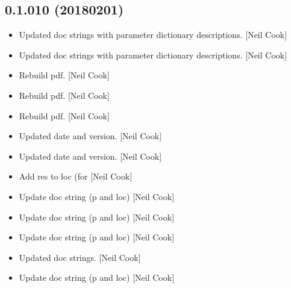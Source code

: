 \documentclass[a4paper,10pt,english]{report}
\begin{document}
\subsection{0.1.010 (2018\sphinxhyphen{}02\sphinxhyphen{}01)}
\label{\detokenize{misc/changelog:id512}}\begin{itemize}
\item {} 
Updated doc strings with parameter dictionary descriptions. {[}Neil
Cook{]}

\item {} 
Updated doc strings with parameter dictionary descriptions. {[}Neil
Cook{]}

\item {} 
Rebuild pdf. {[}Neil Cook{]}

\item {} 
Rebuild pdf. {[}Neil Cook{]}

\item {} 
Rebuild pdf. {[}Neil Cook{]}

\item {} 
Updated date and version. {[}Neil Cook{]}

\item {} 
Updated date and version. {[}Neil Cook{]}

\item {} 
Add res to loc (for  {[}Neil Cook{]}

\item {} 
Update doc string (p and loc) {[}Neil Cook{]}

\item {} 
Update doc string (p and loc) {[}Neil Cook{]}

\item {} 
Update doc string (p and loc) {[}Neil Cook{]}

\item {} 
Updated doc strings. {[}Neil Cook{]}

\item {} 
Update doc string (p and loc) {[}Neil Cook{]}

\end{itemize}
\end{document}
